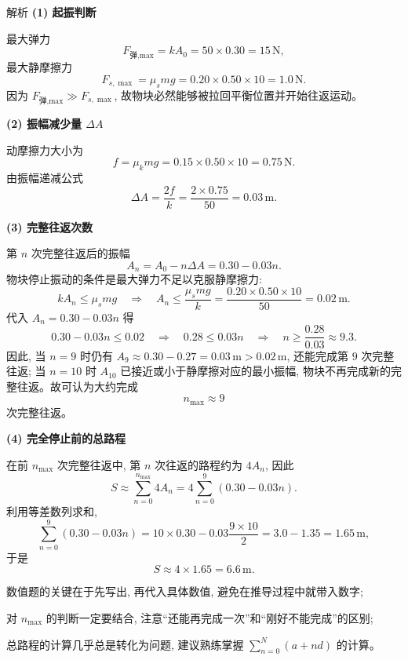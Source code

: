 \documentclass[a4paper,11pt]{ctexart}
\begin{document}
\begin{proofbox}{解析}
\textbf{(1) 起振判断}

最大弹力
\[
  F_{\text{弹,max}} = kA_0 = 50\times 0.30 = 15\,\mathrm{N},
\]
最大静摩擦力
\[
  F_{s,\max} = \mu_s mg = 0.20\times 0.50\times 10 = 1.0\,\mathrm{N}.
\]
因为 $F_{\text{弹,max}}\gg F_{s,\max}$, 故物块必然能够被拉回平衡位置并开始往返运动。

\medskip
\textbf{(2) 振幅减少量 $\Delta A$}

动摩擦力大小为
\[
  f = \mu_k mg = 0.15\times 0.50\times 10 = 0.75\,\mathrm{N}.
\]
由振幅递减公式
\[
  \Delta A = \frac{2f}{k} = \frac{2\times 0.75}{50} = 0.03\,\mathrm{m}.
\]

\medskip
\textbf{(3) 完整往返次数}

第 $n$ 次完整往返后的振幅
\[
  A_n = A_0 - n\Delta A = 0.30 - 0.03n.
\]
物块停止振动的条件是最大弹力不足以克服静摩擦力:
\[
  kA_n \le \mu_s mg 
  \quad\Rightarrow\quad 
  A_n \le \frac{\mu_s mg}{k}
  = \frac{0.20\times 0.50\times 10}{50}
  = 0.02\,\mathrm{m}.
\]
代入 $A_n=0.30-0.03n$ 得
\[
  0.30-0.03n \le 0.02
  \quad\Rightarrow\quad
  0.28 \le 0.03n
  \quad\Rightarrow\quad
  n \ge \frac{0.28}{0.03}\approx 9.3.
\]
因此, 当 $n=9$ 时仍有 $A_9\approx 0.30-0.27=0.03\,\mathrm{m}>0.02\,\mathrm{m}$, 还能完成第 $9$ 次完整往返; 当 $n=10$ 时 $A_{10}$ 已接近或小于静摩擦对应的最小振幅, 物块不再完成新的完整往返。故可认为大约完成
\[
  n_{\max}\approx 9
\]
次完整往返。

\medskip
\textbf{(4) 完全停止前的总路程}

在前 $n_{\max}$ 次完整往返中, 第 $n$ 次往返的路程约为 $4A_n$, 因此
\[
  S \approx \sum_{n=0}^{n_{\max}}4A_n
    = 4\sum_{n=0}^{9}(0.30-0.03n).
\]
利用等差数列求和,
\[
  \sum_{n=0}^{9}(0.30-0.03n)
  = 10\times 0.30 - 0.03\frac{9\times 10}{2}
  = 3.0 - 1.35
  = 1.65\,\mathrm{m},
\]
于是
\[
  S \approx 4\times 1.65 = 6.6\,\mathrm{m}.
\]

\begin{focuspoints}
  \item 数值题的关键在于先写出, 再代入具体数值, 避免在推导过程中就带入数字;
  \item 对 $n_{\max}$ 的判断一定要结合, 注意“还能再完成一次”和“刚好不能完成”的区别;
  \item 总路程的计算几乎总是转化为问题, 建议熟练掌握 $\displaystyle \sum_{n=0}^{N}(a+nd)$ 的计算。
\end{focuspoints}
\end{proofbox}
\end{document}
